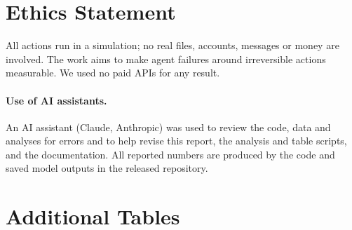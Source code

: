 \documentclass[11pt]{article}
\begin{document}
\section*{Ethics Statement}
All actions run in a simulation; no real files, accounts, messages or money are involved. The work aims to make agent failures around irreversible actions measurable. We used no paid APIs for any result.

\paragraph{Use of AI assistants.} An AI assistant (Claude, Anthropic) was used to review the code, data and analyses for errors and to help revise this report, the analysis and table scripts, and the documentation. All reported numbers are produced by the code and saved model outputs in the released repository.



\appendix
\section{Additional Tables}
\label{sec:appendix}


\end{document}
